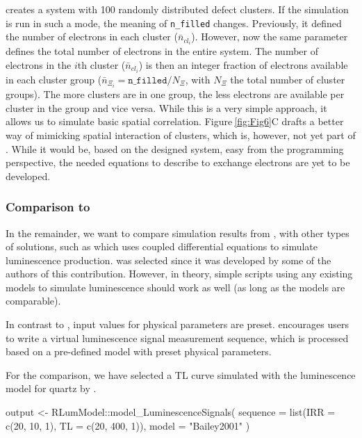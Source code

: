\noindent{}creates a system with 100 randomly distributed defect clusters. If the
simulation is run in such a mode, the meaning of \texttt{n\_filled}
changes. Previously, it defined the number of electrons in each cluster
(\(\bar{n}_{cl_i}\)). However, now the same parameter defines the total
number of electrons in the entire system. The number of electrons in the
\(i\)th cluster (\(\bar{n}_{cl_i}\)) is then an integer fraction of
electrons available in each cluster group
(\(\bar{n}_{\Xi_{i}} = \mathtt{n\_filled}/ N_{\Xi}\), with \(N_{\Xi}\)
the total number of cluster groups). The more clusters are in one group,
the less electrons are available per cluster in the group and vice
versa. While this is a very simple approach, it allows us to simulate
basic spatial correlation. Figure\(~\)\ref{fig:Fig6}C drafts a better
way of mimicking spatial interaction of clusters, which is, however, not
yet part of . While it would be, based on the
designed system, easy from the programming perspective, the needed
equations to describe to exchange electrons are yet to be developed.

\hypertarget{comparison-to}{%
\subsubsection{\texorpdfstring{Comparison to
}{Comparison to }}\label{comparison-to}}

In the remainder, we want to compare simulation results from
, with other types of solutions, such as
 which uses coupled differential equations to
simulate luminescence production.  was selected since
it was developed by some of the authors of this contribution. However,
in theory, simple scripts using any existing models to simulate
luminescence should work as well (as long as the models are comparable).

In contrast to ,  input values for
physical parameters are preset.  encourages users to
write a virtual luminescence signal measurement sequence, which is
processed based on a pre-defined model with preset physical parameters.

For the comparison, we have selected a TL curve simulated with the
luminescence model for quartz by \citet{Bailey_2001yo}.

\begin{Schunk}
\begin{Sinput}
output <- RLumModel::model_LuminescenceSignals(
  sequence = list(IRR = c(20, 10, 1), TL = c(20, 400, 1)),
  model = "Bailey2001"
)
\end{Sinput}
\end{Schunk}

